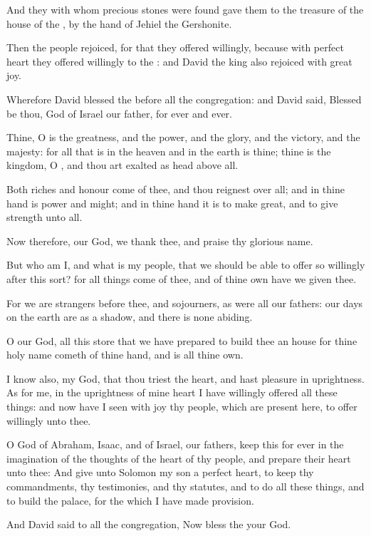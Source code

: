 \verse And they with whom precious stones were found gave them to the treasure of the house of the \LORD, by the hand of Jehiel the Gershonite.

\verse Then the people rejoiced, for that they offered willingly, because with perfect heart they offered willingly to the \LORD: and David the king also rejoiced with great joy.

\verse Wherefore David blessed the \LORD before all the congregation: and David said, Blessed be thou, \LORD God of Israel our father, for ever and ever.

\verse Thine, O \LORD is the greatness, and the power, and the glory, and the victory, and the majesty: for all that is in the heaven and in the earth is thine; thine is the kingdom, O \LORD, and thou art exalted as head above all.

\verse Both riches and honour come of thee, and thou reignest over all; and in thine hand is power and might; and in thine hand it is to make great, and to give strength unto all.

\verse Now therefore, our God, we thank thee, and praise thy glorious name.

\verse But who am I, and what is my people, that we should be able to offer so willingly after this sort? for all things come of thee, and of thine own have we given thee.

\verse For we are strangers before thee, and sojourners, as were all our fathers: our days on the earth are as a shadow, and there is none abiding.

\verse O \LORD our God, all this store that we have prepared to build thee an house for thine holy name cometh of thine hand, and is all thine own.

\verse I know also, my God, that thou triest the heart, and hast pleasure in uprightness. As for me, in the uprightness of mine heart I have willingly offered all these things: and now have I seen with joy thy people, which are present here, to offer willingly unto thee.

\verse O \LORD God of Abraham, Isaac, and of Israel, our fathers, keep this for ever in the imagination of the thoughts of the heart of thy people, and prepare their heart unto thee: \verse And give unto Solomon my son a perfect heart, to keep thy commandments, thy testimonies, and thy statutes, and to do all these things, and to build the palace, for the which I have made provision.

\verse And David said to all the congregation, Now bless the \LORD your God.


